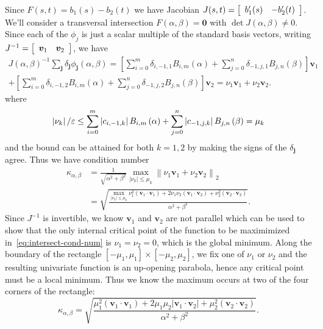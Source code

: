 Since \(F(s, t) = b_1(s) - b_2(t)\) we have Jacobian \(J(s, t) =
\left[ \begin{array}{c c} b_1'(s) & -b_2'(t) \end{array}\right]\). We'll
consider a transversal intersection \(F(\alpha, \beta) = \bm{0}\) with
\(\det J(\alpha, \beta) \neq 0\). Since each of the
\(\phi_j\) is just a scalar multiple of the standard basis
vectors, writing \(J^{-1} = \left[ \begin{array}{c c}
\bm{v}_1 & \bm{v}_2 \end{array}\right]\), we have
\begin{multline}
J\left(\alpha, \beta\right)^{-1} \sum_{\bm{j}} \delta_{\bm{j}}
  \phi_{\bm{j}}\left(\alpha, \beta\right) = \left[\sum_{i = 0}^m
  \delta_{i, -1, 1} B_{i, m}\left(\alpha\right) + \sum_{j = 0}^n
  \delta_{-1, j, 1} B_{j, n}\left(\beta\right)\right] \bm{v}_1 \\
+ \left[\sum_{i = 0}^m
  \delta_{i, -1, 2} B_{i, m}\left(\alpha\right) + \sum_{j = 0}^n
  \delta_{-1, j, 2} B_{j, n}\left(\beta\right)\right] \bm{v}_2 =
  \nu_1 \bm{v}_1 + \nu_2 \bm{v}_2.
\end{multline}
where
\begin{equation}\label{eq:nu-bounds}
\left|\nu_k\right| / \varepsilon \leq \sum_{i = 0}^m
  \left|c_{i, -1, k}\right| B_{i, m}\left(\alpha\right) + \sum_{j = 0}^n
  \left|c_{-1, j, k}\right| B_{j, n}\left(\beta\right) = \mu_k
\end{equation}
and the bound can be attained for both \(k = 1, 2\) by making the
signs of the \(\delta_{\bm{j}}\) agree. Thus we have condition
number
\begin{align}
\kappa_{\alpha, \beta} &= \frac{1}{\sqrt{\alpha^2 + \beta^2}}
  \max_{\left|\nu_k\right| \leq \mu_k} \left \lVert \nu_1 \bm{v}_1 +
  \nu_2 \bm{v}_2 \right \rVert_2 \\
  &=
  \sqrt{\frac{\max_{\left|\nu_k\right| \leq \mu_k}
  \nu_1^2 \left(\bm{v}_1 \cdot \bm{v}_1\right) +
  2 \nu_1 \nu_2 \left(\bm{v}_1 \cdot \bm{v}_2\right) +
  \nu_2^2 \left(\bm{v}_2 \cdot \bm{v}_2\right)}{\alpha^2 + \beta^2}}
  \label{eq:intersect-cond-num}.
\end{align}
Since \(J^{-1}\) is invertible, we know \(\bm{v}_1\) and \(\bm{v}_2\) are
not parallel which can be used to show that the only internal critical
point of the function to be maximimized in~\eqref{eq:intersect-cond-num}
is \(\nu_1 = \nu_2 = 0\), which is the global minimum. Along the boundary of
the rectangle
\(\left[-\mu_1, \mu_1\right] \times \left[-\mu_2, \mu_2\right]\),
we fix one of \(\nu_1\) or \(\nu_2\) and the resulting univariate function is
an up-opening parabola, hence any critical point must be a local
minimum. Thus we know the maximum occurs at two of the four corners of the
rectangle:
\begin{equation}\label{eq:intersect-cond-num-too}
\kappa_{\alpha, \beta} = \sqrt{\frac{\mu_1^2
  \left(\bm{v}_1 \cdot \bm{v}_1\right) +
  2 \mu_1 \mu_2 \left|\bm{v}_1 \cdot \bm{v}_2\right| +
  \mu_2^2 \left(\bm{v}_2 \cdot \bm{v}_2\right)}{\alpha^2 + \beta^2}}.
\end{equation}

